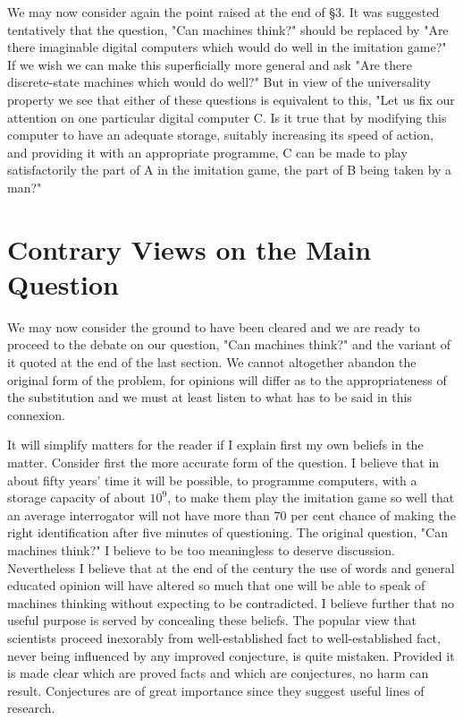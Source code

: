 \documentclass{article}
\begin{document}
We may now consider again the point raised at the end of §3. It was suggested tentatively that the question, "Can machines think?" should be replaced by "Are there imaginable digital computers which would do well in the imitation game?" If we wish we can make this superficially more general and ask "Are there discrete-state machines which would do well?" But in view of the universality property we see that either of these questions is equivalent to this, "Let us fix our attention on one particular digital computer C. Is it true that by modifying this computer to have an adequate storage, suitably increasing its speed of action, and providing it with an appropriate programme, C can be made to play satisfactorily the part of A in the imitation game, the part of B being taken by a man?"


\section{Contrary Views on the Main Question}

We may now consider the ground to have been cleared and we are ready to proceed to the debate on our question, "Can machines think?" and the variant of it quoted at the end of the last section. We cannot altogether abandon the original form of the problem, for opinions will differ as to the appropriateness of the substitution and we must at least listen to what has to be said in this connexion.

It will simplify matters for the reader if I explain first my own beliefs in the matter. Consider first the more accurate form of the question. I believe that in about fifty years' time it will be possible, to programme computers, with a storage capacity of about $10^9$, to make them play the imitation game so well that an average interrogator will not have more than 70 per cent chance of making the right identification after five minutes of questioning. The original question, "Can machines think?" I believe to be too meaningless to deserve discussion. Nevertheless I believe that at the end of the century the use of words and general educated opinion will have altered so much that one will be able to speak of machines thinking without expecting to be contradicted. I believe further that no useful purpose is served by concealing these beliefs. The popular view that scientists proceed inexorably from well-established fact to well-established fact, never being influenced by any improved conjecture, is quite mistaken. Provided it is made clear which are proved facts and which are conjectures, no harm can result. Conjectures are of great importance since they suggest useful lines of research.
\end{document}
